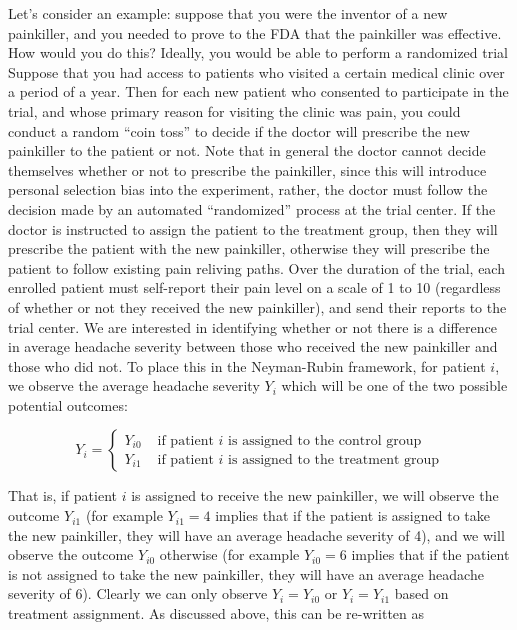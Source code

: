 Let's consider an example: suppose that you were the inventor of a new painkiller, and you needed to prove to the FDA that the painkiller was effective. How would you do this? Ideally, you would be able to perform a randomized trial Suppose that you had access to patients who visited a certain medical clinic over a period of a year. Then for each new patient who consented to participate in the trial, and whose primary reason for visiting the clinic was pain, you could conduct a random ``coin toss'' to decide if the doctor will prescribe the new painkiller to the patient or not. Note that in general the doctor cannot decide themselves whether or not to prescribe the painkiller, since this will introduce personal selection bias into the experiment, rather, the doctor must follow the decision made by an automated ``randomized'' process at the trial center. If the doctor is instructed to assign the patient to the treatment group, then they will prescribe the patient with the new painkiller, otherwise they will prescribe the patient to follow existing pain reliving paths. Over the duration of the trial, each enrolled patient must self-report their pain level on a scale of 1 to 10 (regardless of whether or not they received the new painkiller), and send their reports to the trial center. We are interested in identifying whether or not there is a difference in average headache severity between those who received the new painkiller and those who did not. To place this in the Neyman-Rubin framework, for patient $i$, we observe the average headache severity $Y_{i}$ which will be one of the two possible potential outcomes:

$$Y_{i} = \begin{cases} Y_{i0} & \textrm{ if patient $i$ is assigned to the control group} \\ 
Y_{i1} & \text{ if patient $i$ is assigned to the treatment group} \end{cases}$$ 


That is, if patient $i$ is assigned to receive the new painkiller, we will observe the outcome $Y_{i1}$ (for example $Y_{i1} = 4$ implies that if the patient is assigned to take the new painkiller, they will have an average headache severity of 4), and we will observe the outcome $Y_{i0}$ otherwise (for example $Y_{i0} = 6$ implies that if the patient is not assigned to take the new painkiller, they will have an average headache severity of 6). Clearly we can only observe $Y_i = Y_{i0}$ or $Y_i = Y_{i1}$ based on treatment assignment. As discussed above, this can be re-written as

